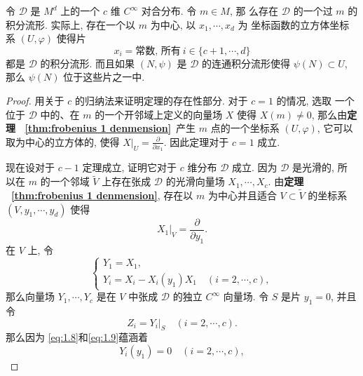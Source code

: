 \begin{thm}[Frobenius定理]\label{thm: Frobenius}
    令 $\mathscr{D}$ 是 $M^d$ 上的一个 $c$ 维 $C^{\infty}$  对合分布. 令 $m \in M$, 那 么存在 $\mathscr{D}$ 的一个过 $m$ 的积分流形. 实际上, 存在一个以 $m$ 为中心, 以 $x_1, \cdots, x_d$ 为 坐标函数的立方体坐标系 $(U, \varphi)$ 使得片
    \begin{equation}
        \label{eq:1.7}
        x_i= \text{常数, 所有} ~i \in\{c+1, \cdots, d\}
    \end{equation}
都是 $\mathscr{D}$ 的积分流形. 而且如果 $(N, \psi)$ 是 $\mathscr{D}$ 的连通积分流形使得 $\psi(N) \subset U$, 那么 $\psi(N)$ 位于这些片之一中.
\end{thm}
\begin{proof}
用关于 $c$ 的归纳法来证明定理的存在性部分. 对于 $c=1$ 的情况, 选取 一个位于 $\mathscr{D}$ 中的、在 $m$ 的一个开邻域上定义的向量场 $X$ 使得 $X(m) \neq 0$, 那么由\textbf{定理 ~\ref{thm:frobenius 1 denmension}}~产生 $m$ 点的一个坐标系 $(U, \varphi)$, 它可以取为中心的立方体的, 使得 $\left.X\right|_U=\frac{\partial}{\partial x_1}$. 因此定理对于 $c=1$ 成立.

现在设对于 $c-1$ 定理成立, 证明它对于 $c$ 维分布 $\mathscr{D}$ 成立. 因为 $\mathscr{D}$ 是光滑的, 所 以在 $m$ 的一个邻域 $\tilde{V}$ 上存在张成 $\mathscr{D}$ 的光滑向量场 $X_1, \cdots, X_c$. 由\textbf{定理 ~\ref{thm:frobenius 1 denmension}}, 存在以 $m$ 为中心并且适合 $V \subset \tilde{V}$ 的坐标系 $\left(V, y_1, \cdots, y_d\right)$ 使得
\begin{equation}
    \label{eq:1.8}
    \left.X_1\right|_V=\frac{\partial}{\partial y_1} .
\end{equation}
在 $V$ 上, 令
\begin{equation}
    \label{eq:1.9}
    \left\{\begin{array}{l}
Y_1=X_1, \\
Y_i=X_i-X_i\left(y_1\right) X_1 \quad(i=2, \cdots, c),
\end{array}\right.
\end{equation}
那么向量场 $Y_1, \cdots, Y_c$ 是在 $V$ 中张成 $\mathscr{D}$ 的独立 $C^{\infty}$ 向量场. 令 $S$ 是片 $y_1=0$, 并且令
\begin{equation}\label{eq:1.10}
    Z_i=Y_i |_S\quad (i=2,\cdots,c).
\end{equation}
那么因为 \eqref{eq:1.8}和\eqref{eq:1.9}蕴涵着
\begin{equation}
    \label{eq:1.11}
    Y_i\left(y_1\right)=0 \quad(i=2, \cdots, c),
\end{equation}


\end{proof}

